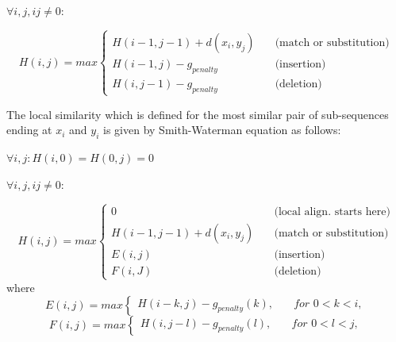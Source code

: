 \documentclass[12pt,twoside]{article}
\begin{document}
\( \forall i,j,ij \neq 0: \)

\[ H(i,j) =  max
\begin{cases}	
	H(i - 1, j - 1) + d(x_i, y_j) & \quad \text{(match or substitution)} \\
	H(i - 1, j) - g_{penalty} 	  & \quad \text{(insertion)}\\
	H(i, j - 1) - g_{penalty}     & \quad \text{(deletion)}
\end{cases}
\]

The local similarity which is defined for the most similar pair of sub-sequences ending at $x_i$ and $y_i$ is given by
Smith-Waterman \cite{smith_identification_1981} equation as follows:

\( \forall i,j :  H(i,0) = H(0,j) = 0 \)

\( \forall i,j,ij \neq 0: \)

\[ H(i,j) =  max
\begin{cases}
	0							  & \quad \text{(local align. starts here)} \\
	H(i - 1, j - 1) + d(x_i, y_j) & \quad \text{(match or substitution)} \\
	E(i,j)	  & \quad \text{(insertion)}\\
	F(i,J)    & \quad \text{(deletion)}
\end{cases}
\]
where
\[
E(i,j) = max \begin{cases} H(i - k, j) - g_{penalty}(k), & \quad for \,\, 0 < k < i, \end{cases} 
\]
\[
F(i,j) = max \begin{cases} H(i,j - l) - g_{penalty}(l), & \quad for \,\, 0 < l < j, \end{cases}
\]
\end{document}
